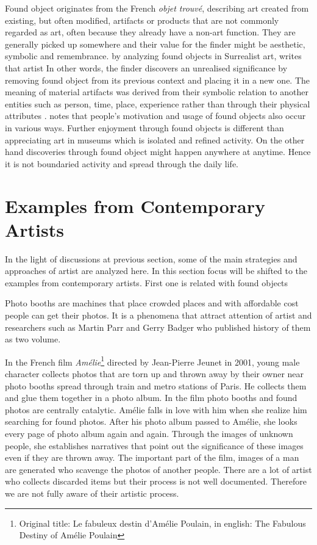 Found object originates from the French \textit{objet trouvé}, describing art created from existing, but often modified, artifacts or products that are not commonly regarded as art, often because they already have a non-art function. They are generally picked up somewhere and their value for the finder might be aesthetic, symbolic and remembrance. \citet[170]{gascoyne1936short} by analyzing found objects in Surrealist art, writes that artist  In other words, the finder discovers an unrealised significance by removing found object from its previous context and placing it in a new one. The meaning of material artifacts was derived from their symbolic relation to another entities such as person, time, place, experience rather than through their physical attributes \citep{camic2010trashed}. \cite{camic2010trashed} notes that people’s motivation and usage of found objects also occur in various ways. Further enjoyment through found objects is different than appreciating art in museums which is isolated and refined activity. On the other hand discoveries through found object might happen anywhere at anytime. Hence it is not boundaried activity and spread through the daily life.



\section{Examples from Contemporary Artists}
In the light of discussions at previous section, some of the main strategies and approaches of artist are analyzed here. In this section focus will be shifted to the examples from contemporary artists. First one is related with found objects

Photo booths are machines that place crowded places and with affordable cost people can get their photos. It is a phenomena that attract attention of artist and researchers such as Martin Parr and Gerry Badger who published history of them as two volume.

In the French film \textit{Amélie}\footnote{Original title: Le fabuleux destin d’Amélie Poulain, in english: The Fabulous Destiny of Amélie Poulain} directed by Jean-Pierre Jeunet in 2001, young male character collects photos that are torn up and thrown away by their owner near photo booths spread through train and metro stations of Paris. He collects them and glue them together in a photo album. In the film photo booths and found photos are centrally catalytic. Amélie falls in love with him when she realize him searching for found photos. After his photo album passed to Amélie, she looks every page of photo album again and again. Through the images of unknown people, she establishes narratives that point out the significance of these images even if they are thrown away. The important part of the film, images of a man are generated who scavenge the photos of another people. There are a lot of artist who collects discarded items but their process is not well documented. Therefore we are not fully aware of their artistic process. 

